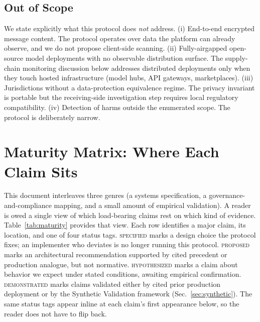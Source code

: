 \documentclass[11pt]{article}
\begin{document}
\subsection{Out of Scope}
\label{sec:oos}
We state explicitly what this protocol does \emph{not} address. (i) End-to-end encrypted message content. The protocol operates over data the platform can already observe, and we do not propose client-side scanning. (ii) Fully-airgapped open-source model deployments with no observable distribution surface. The supply-chain monitoring discussion below addresses distributed deployments only when they touch hosted infrastructure (model hubs, API gateways, marketplaces). (iii) Jurisdictions without a data-protection equivalence regime. The privacy invariant is portable but the receiving-side investigation step requires local regulatory compatibility. (iv) Detection of harms outside the enumerated scope. The protocol is deliberately narrow.

\section{Maturity Matrix: Where Each Claim Sits}
\label{sec:maturity}

This document interleaves three genres (a systems specification, a governance-and-compliance mapping, and a small amount of empirical validation). A reader is owed a single view of which load-bearing claims rest on which kind of evidence. Table~\ref{tab:maturity} provides that view. Each row identifies a major claim, its location, and one of four status tags. \textsc{specified} marks a design choice the protocol fixes; an implementer who deviates is no longer running this protocol. \textsc{proposed} marks an architectural recommendation supported by cited precedent or production analogue, but not normative. \textsc{hypothesized} marks a claim about behavior we expect under stated conditions, awaiting empirical confirmation. \textsc{demonstrated} marks claims validated either by cited prior production deployment or by the Synthetic Validation framework (Sec.~\ref{sec:synthetic}). The same status tags appear inline at each claim's first appearance below, so the reader does not have to flip back.
\end{document}

